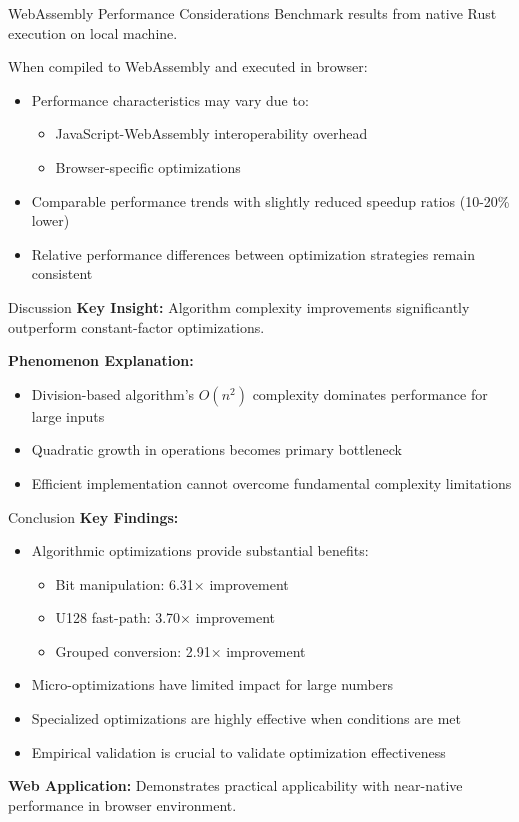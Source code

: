 \documentclass[10pt]{beamer}
\begin{document}
\begin{frame}{WebAssembly Performance Considerations}
Benchmark results from native Rust execution on local machine.

\vspace{0.3cm}
When compiled to WebAssembly and executed in browser:
\begin{itemize}
\item Performance characteristics may vary due to:
  \begin{itemize}
  \item JavaScript-WebAssembly interoperability overhead
  \item Browser-specific optimizations
  \end{itemize}
\item Comparable performance trends with slightly reduced speedup ratios (10-20\% lower)
\item Relative performance differences between optimization strategies remain consistent
\end{itemize}
\end{frame}

\begin{frame}{Discussion}
\textbf{Key Insight:} Algorithm complexity improvements significantly outperform constant-factor optimizations.

\vspace{0.3cm}
\textbf{Phenomenon Explanation:}
\begin{itemize}
\item Division-based algorithm's $O(n^2)$ complexity dominates performance for large inputs
\item Quadratic growth in operations becomes primary bottleneck
\item Efficient implementation cannot overcome fundamental complexity limitations
\end{itemize}
\end{frame}

\begin{frame}{Conclusion}
\textbf{Key Findings:}
\begin{itemize}
\item Algorithmic optimizations provide substantial benefits:
  \begin{itemize}
  \item Bit manipulation: 6.31× improvement
  \item U128 fast-path: 3.70× improvement
  \item Grouped conversion: 2.91× improvement
  \end{itemize}
\item Micro-optimizations have limited impact for large numbers
\item Specialized optimizations are highly effective when conditions are met
\item Empirical validation is crucial to validate optimization effectiveness
\end{itemize}

\vspace{0.3cm}
\textbf{Web Application:} Demonstrates practical applicability with near-native performance in browser environment.
\end{frame}
\end{document}
